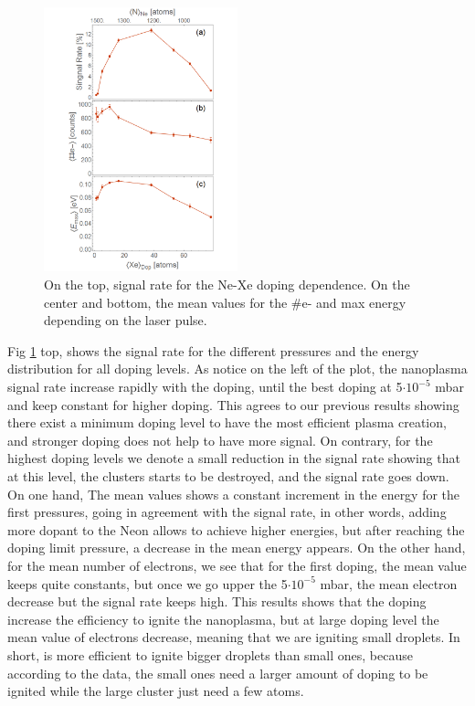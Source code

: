 \begin{figure}[hbtp]
\centering
\includegraphics[width=0.5\textwidth]{../Images/results/MIR_Ne_XeDop_39K/Alltogether.png}
\caption[MIR Ne-Xe. Signal rate and mean values]{On the top, signal rate for the Ne-Xe doping dependence. On the center and bottom, the mean values for the $\#$e- and max energy depending on the laser pulse.}
\label{fig:NeXeall}
\end{figure}

Fig \ref{fig:NeXeall} top, shows the signal rate for the different pressures and the energy distribution for all doping levels. As notice on the left of the plot, the nanoplasma signal rate increase rapidly with the doping, until the best doping at 5$\cdot10^{-5}$ mbar and keep constant for higher doping. This agrees to our previous results showing there exist a minimum doping level to have the most efficient plasma creation, and stronger doping does not help to have more signal. On contrary, for the highest doping levels we denote a small reduction in the signal rate showing that at this level, the clusters starts to be destroyed, and the signal rate goes down.
On one hand,  The mean values shows a constant increment in the energy for the first pressures, going in agreement with the signal rate, in other words, adding more dopant to the  Neon allows to achieve higher energies, but after reaching the doping limit pressure, a decrease in the mean energy appears. On the other hand, for the mean number of electrons, we see that for the first doping, the mean value keeps quite constants, but once we go upper the 5$\cdot10^{-5}$ mbar, the mean electron decrease but the signal rate keeps high. This results shows that the doping increase the efficiency to ignite the nanoplasma, but at large doping level the mean value of electrons decrease, meaning that we are igniting small droplets. In short, is more efficient to ignite bigger droplets than small ones, because according to the data, the small ones need a larger amount of doping to be ignited while the large cluster just need a few atoms.

